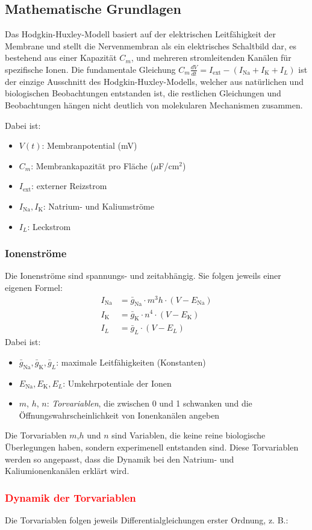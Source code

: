 \begin{refsection}
\subsection{Mathematische Grundlagen}
Das Hodgkin-Huxley-Modell basiert auf der elektrischen Leitfähigkeit der Membrane und stellt die Nervenmembran als ein
elektrisches Schaltbild dar, es bestehend aus einer Kapazität $C_m$, und mehreren stromleitenden Kanälen für spezifische
Ionen.
Die fundamentale Gleichung $C_m \frac{dV}{dt} = I_{\text{ext}} - (I_{\text{Na}} + I_{\text{K}} + I_L)$ ist der einzige Ausschnitt des Hodgkin-Huxley-Modells, welcher aus natürlichen und biologischen Beobachtungen entstanden ist, die restlichen Gleichungen und Beobachtungen hängen nicht deutlich von molekularen Mechanismen zusammen.

Dabei ist:

\begin{itemize}
	\item $V(t)$: Membranpotential (mV)
	\item $C_m$: Membrankapazität pro Fläche ($\mu$F/cm$^2$)
	\item $I_{\text{ext}}$: externer Reizstrom
	\item $I_{\text{Na}}, I_{\text{K}}$: Natrium- und Kaliumströme
	\item $I_L$: Leckstrom
\end{itemize}
\subsubsection{Ionenströme}
Die Ionenströme sind spannungs- und zeitabhängig. Sie folgen jeweils einer eigenen Formel:
\[
\begin{aligned}
	I_{\text{Na}} &= \bar{g}_{\text{Na}} \cdot m^3 h \cdot (V - E_{\text{Na}}) \\
	I_{\text{K}} &= \bar{g}_{\text{K}} \cdot n^4 \cdot (V - E_{\text{K}}) \\
	I_L &= \bar{g}_L \cdot (V - E_L)
\end{aligned}
\]
\noindent
Dabei ist:

\begin{itemize}
	\item $\bar{g}_{\text{Na}},  \bar{g}_{\text{K}},  \bar{g}_L$: maximale Leitfähigkeiten (Konstanten)
	\item $E_{\text{Na}}, E_{\text{K}}, E_L$: Umkehrpotentiale der Ionen
	\item $m$, $h$, $n$: \emph{Torvariablen}, die zwischen 0 und 1 schwanken und die Öffnungswahrscheinlichkeit von Ionenkanälen angeben
\end{itemize}
Die Torvariablen $m$,$h$ und $n$ sind Variablen, die keine reine biologische Überlegungen haben, sondern experimenell entstanden sind. Diese Torvariablen werden so angepasst, dass die Dynamik bei den Natrium- und Kaliumionenkanälen erklärt wird.
\textcolor{red}{\subsubsection{Dynamik der Torvariablen}} %
Die Torvariablen folgen jeweils Differentialgleichungen erster Ordnung, z. B.:


\end{refsection}
